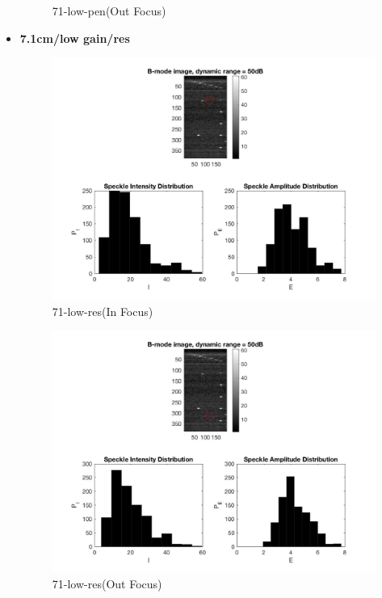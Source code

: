 \documentclass[12pts,a4paper]{article}
\begin{document}
\begin{itemize}
\begin{figure}[h]
    \caption{71-low-pen(Out Focus)}
    \label{fig:mesh1}
\end{figure}
\pagebreak
\item{\textbf{7.1cm/low gain/res}}
\begin{center}
\end{center}
\begin{figure}[h]
    \centering
    \includegraphics[width=1.0\textwidth]{img_hw2/71-low-res1.jpg}
    \caption{71-low-res(In Focus)}
    \label{fig:mesh1}
\end{figure}
\pagebreak
\begin{figure}[h]
    \centering
    \includegraphics[width=1.0\textwidth]{img_hw2/71-low-res2.jpg}
    \caption{71-low-res(Out Focus)}
    \label{fig:mesh1}
\end{figure}
\end{itemize}
\end{document}
